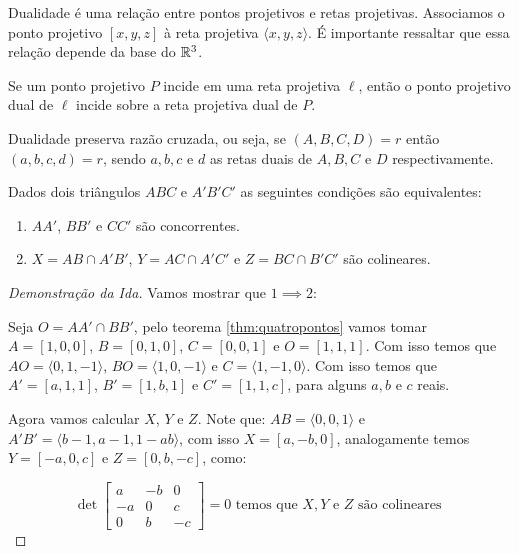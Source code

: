 Dualidade é uma relação entre pontos projetivos e retas projetivas. Associamos o ponto projetivo $[x, y, z]$ à reta projetiva $\langle x, y, z\rangle$. É importante ressaltar que essa relação depende da base do \(\mathbb{R}^3\).

\begin{prop}
    Se um ponto projetivo $P$ incide em uma reta projetiva $\ell$, então o ponto projetivo dual de $\ell$ incide sobre a reta projetiva dual de $P$.
\end{prop}


\begin{thm}
Dualidade preserva razão cruzada, ou seja, se $(A,B,C,D) = r$ então $(a,b,c,d) = r$, sendo $a,b,c$ e $d$ as retas duais de $A,B,C$ e $D$ respectivamente.
\end{thm}

\begin{thm}
Dados dois triângulos $ABC$ e $A'B'C'$ as seguintes condições são equivalentes:
\begin{enumerate}
    \item $AA'$, $BB'$ e $CC'$ são concorrentes.
    \item $X = AB \cap A'B'$, $Y = AC\cap A'C'$ e $Z = BC \cap B'C'$ são colineares.
\end{enumerate}
\end{thm}

\begin{proof}[Demonstração da Ida]
Vamos mostrar que $1 \implies 2$:

Seja $O = AA' \cap BB'$, pelo teorema \ref{thm:quatropontos} vamos tomar $A = [1, 0, 0]$, $B = [0, 1, 0]$, $C = [0, 0, 1]$ e $O = [1, 1, 1]$. Com isso temos que $AO = \langle 0, 1, -1 \rangle$, $BO = \langle 1, 0, -1 \rangle$ e $C = \langle 1, -1, 0 \rangle$. Com isso temos que $A' = [a,1,1]$, $B' = [1,b,1]$ e $C'= [1,1,c]$, para alguns $a,b$ e $c$ reais. 

Agora vamos calcular $X$, $Y$ e $Z$. Note que: $AB = \langle 0,0,1 \rangle$ e $A'B' = \langle b-1,a-1,1-ab \rangle$, com isso $X = [a,-b,0]$, analogamente temos $Y = [-a,0,c]$ e $Z = [0,b,-c]$, como:

\[\det \begin{bmatrix} a & -b & 0 \\ -a & 0 & c \\ 0 & b & -c \end{bmatrix} = 0 \text{ temos que } X,Y \text{ e } Z \text{ são colineares } \]
\end{proof}

